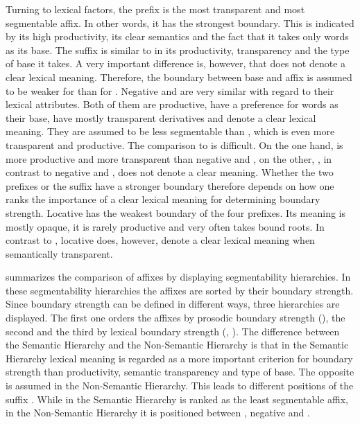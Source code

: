 Turning to lexical factors, the prefix  is the most transparent and most segmentable affix. In other words, it has the strongest boundary. This is indicated by its high productivity, its clear semantics and the fact that it takes only words as its base. The suffix  is similar to  in its productivity, transparency and the type of base it takes. A very important difference is, however, that  does not denote a clear lexical meaning. Therefore, the boundary between base and affix is assumed to be weaker for  than for  . 
Negative  and  are very similar with regard to their lexical attributes. Both of them are productive, have a preference for words as their base, have mostly transparent derivatives and denote a clear lexical meaning. They are assumed to be less segmentable than , which is even more transparent and productive. The comparison to  is difficult. On the one hand,  is more productive and more transparent than negative  and , on the other, , in contrast to negative  and , does not denote a clear meaning. Whether the two prefixes or the suffix have a stronger boundary therefore depends on how one ranks the importance of a clear lexical meaning for determining boundary strength. Locative  has the weakest boundary of the four prefixes. Its meaning is mostly opaque, it is rarely productive and very often takes bound roots. In contrast to , locative  does, however, denote a clear lexical meaning when semantically transparent.


 summarizes the comparison of affixes by displaying segmentability hierarchies. In these segmentability hierarchies the affixes are sorted by their boundary strength. Since boundary strength can be defined in different ways, three hierarchies are displayed. The first one orders the affixes by prosodic boundary strength (), the second and the third by lexical boundary strength (, ). The difference between the {Semantic Hierarchy} and the {Non-Semantic Hierarchy} is that in the {Semantic Hierarchy}  lexical meaning is regarded as a more important criterion for boundary strength than productivity, semantic transparency and type of base. The opposite is assumed in the {Non-Semantic Hierarchy}. This leads to different positions of the suffix . While in the {Semantic Hierarchy}  is ranked as the least segmentable affix, in the {Non-Semantic Hierarchy} it is positioned between , negative  and .

